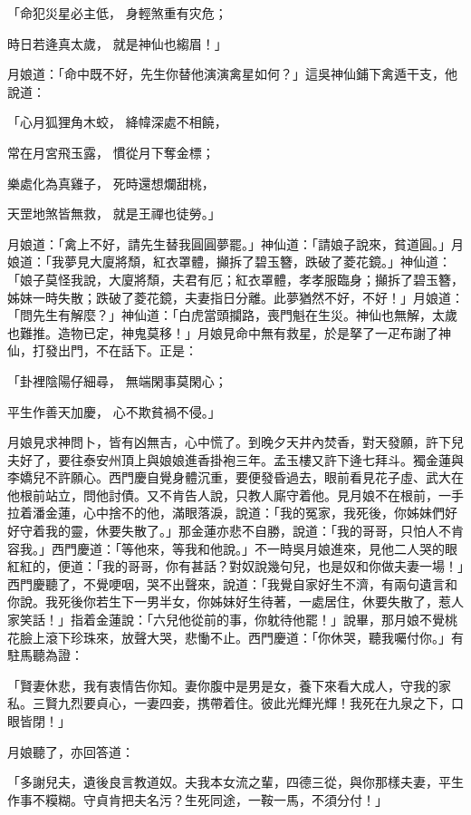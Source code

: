 「命犯災星必主低，  身輕煞重有灾危；

時日若逄真太歲，  就是神仙也縐眉！」

月娘道：「命中既不好，先生你替他演演禽星如何？」這吳神仙鋪下禽遁干支，他說道：

「心月狐狸角木蛟，  絳幃深處不相饒，

常在月宮飛玉露，  慣從月下奪金標；

樂處化為真雞子，  死時還想爛甜桃，

天罡地煞皆無救，  就是王禪也徒勞。」

月娘道：「禽上不好，請先生替我圓圓夢罷。」神仙道：「請娘子說來，貧道圓。」月娘道：「我夢見大廈將頹，紅衣罩體，攧拆了碧玉簪，跌破了菱花鏡。」神仙道：「娘子莫怪我說，大廈將頹，夫君有厄；紅衣罩體，孝孝服臨身；攧拆了碧玉簪，姊妹一時失散；跌破了菱花鏡，夫妻指日分離。此夢猶然不好，不好！」月娘道：「問先生有解麼？」神仙道：「白虎當頭攔路，喪門魁在生災。神仙也無解，太歲也難推。造物已定，神鬼莫移！」月娘見命中無有救星，於是拏了一疋布謝了神仙，打發出門，不在話下。正是：

「卦裡陰陽仔細尋，  無端閑事莫閑心；

平生作善天加慶，  心不欺貧禍不侵。」

月娘見求神問卜，皆有凶無吉，心中慌了。到晚夕天井內焚香，對天發願，許下兒夫好了，要往泰安州頂上與娘娘進香掛袍三年。孟玉樓又許下逄七拜斗。獨金蓮與李嬌兒不許願心。西門慶自覺身體沉重，要便發昏過去，眼前看見花子虛、武大在他根前站立，問他討債。又不肯告人說，只教人廝守着他。見月娘不在根前，一手拉着潘金蓮，心中捨不的他，滿眼落淚，說道：「我的冤家，我死後，你姊妹們好好守着我的靈，休要失散了。」那金蓮亦悲不自勝，說道：「我的哥哥，只怕人不肯容我。」西門慶道：「等他來，等我和他說。」不一時吳月娘進來，見他二人哭的眼紅紅的，便道：「我的哥哥，你有甚話？對奴說幾句兒，也是奴和你做夫妻一場！」西門慶聽了，不覺哽咽，哭不出聲來，說道：「我覺自家好生不濟，有兩句遺言和你說。我死後你若生下一男半女，你姊妹好生待著，一處居住，休要失散了，惹人家笑話！」指着金蓮說：「六兒他從前的事，你躭待他罷！」說畢，那月娘不覺桃花臉上滾下珍珠來，放聲大哭，悲慟不止。西門慶道：「你休哭，聽我囑付你。」有駐馬聽為證：

「賢妻休悲，我有衷情告你知。妻你腹中是男是女，養下來看大成人，守我的家私。三賢九烈要貞心，一妻四妾，携帶着住。彼此光輝光輝！我死在九泉之下，口眼皆閉！」

月娘聽了，亦回答道：

「多謝兒夫，遺後良言教道奴。夫我本女流之輩，四德三從，與你那樣夫妻，平生作事不糢糊。守貞肯把夫名污？生死同途，一鞍一馬，不須分付！」

